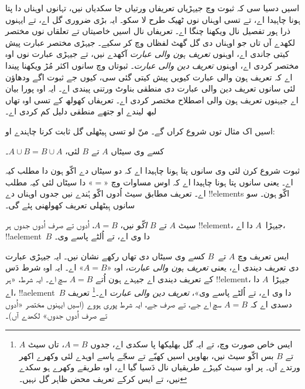 \documentclass[../../../include/open-logic-section]{subfiles}
\begin{document}


اسیں دسیا سی کہ ثبوت وچ جیہڑیاں تعریفاں ورتیاں جا سکدیاں نیں، تہانوں اوہناں دا پتا ہونا چاہیدا اے، تے تسی اوہناں نوں ٹھیک طرح لا سکو۔ ایہ بڑی ضروری گل اے، تے ایہنوں ذرا ہور تفصیل نال ویکھنا چنگا اے۔ تعریفاں نال اسیں خاصیتاں تے تعلقاں نوں مختصر لکھدے آں تاں جو اوہناں دی گل گھٹ لفظاں وچ کر سکیے۔ جیہڑی مختصر عبارت پیش کیتی جاندی اے، اوہنوں \emph{تعریف ہون والی عبارت} آکھدے نیں، تے جیہڑی عبارت نوں اوہ مختصر کردی اے، اوہنوں \emph{تعریف دین والی عبارت}۔ ثبوتاں وچ سانوں اکثر مُڑ ویکھنا پیندا اے کہ تعریف ہون والی عبارت کیویں پیش کیتی گئی سی، کیوں جے ثبوت اگے ودھاؤن لئی سانوں تعریف دین والی عبارت دی منطقی بناوٹ ورتنی پیندی اے۔ ایہ اوہ پورا بیان اے جیہنوں تعریف ہون والی اصطلاح مختصر کردی اے۔ تعریفاں کھولھ کے تسی اوہ تھاں لبھ لیندے او جتھے منطقی دلیل کم کردی اے۔

اسیں اک مثال توں شروع کراں گے۔ منّ لو تسی ہِیٹھلی گل ثابت کرنا چاہندے او:

\begin{prop}
کسے وی سیٹاں $A$ تے $B$ لئی، $A \cup B = B \cup A$۔
\end{prop}

ثبوت شروع کرن لئی وی سانوں پتا ہونا چاہیدا اے کہ دو سیٹاں دے اکّو ہون دا مطلب کیہ اے۔ یعنی سانوں پتا ہونا چاہیدا اے کہ اوس مساوات وچ «$=$» دا سیٹاں لئی کیہ مطلب اے۔ تعریف مطابق سیٹ اُدوں اکّو ہُندے نیں جدوں اوہناں دے !!{element}s اکّو ہون۔ سو سانوں ہِیٹھلی تعریف کھولھنی پئے گی۔

\begin{defn}
سیٹ $A$ تے $B$ \emph{اکّو} نیں، $A = B$، اُدوں تے صرف اُدوں جدوں ہر !!{element}، جیہڑا~$A$ دا اے، !!a{element}~$B$ دا وی اے، تے اُلٹے پاسے وی۔
\end{defn}

ایس تعریف وچ $A$ تے~$B$ کسے وی سیٹاں دی تھاں رکھے نشان نیں۔ ایہ جیہڑی عبارت دی تعریف دیندی اے، یعنی \emph{تعریف ہون والی عبارت}، اوہ «$A = B$» اے۔ ایہ اوہ شرط دَس کے تعریف دیندی اے جیہدے ہون اُتے $A = B$ سچ اے۔ ایہ شرط، «ہر !!{element}، جیہڑا~$A$ دا اے، !!a{element}~$B$ دا وی اے، تے اُلٹے پاسے وی»، \emph{تعریف دین والی عبارت} اے۔\footnote{ایس خاص صورت وچ، تے ایہ گل بھلیکھا پا سکدی اے، جدوں $A = B$، تاں سیٹ $A$ تے $B$ بس اکّو سیٹ نیں، بھاویں اسیں کھبّے تے سجّے پاسے اوہدے لئی وکھرے اکھر ورتدے آں۔ پر اوہ سیٹ کیہڑے طریقیاں نال دَسیا گیا اے، اوہ طریقے وکھرے ہو سکدے نیں، تے ایس کرکے تعریف محض ظاہر گل نہیں۔} تعریف دسدی اے کہ $A = B$ سچ اے جے، تے صرف جے، ایہ شرط پوری ہووے (اسیں ایہنوں مختصر «اُدوں تے صرف اُدوں جدوں» لکھدے آں)۔
\end{document}
